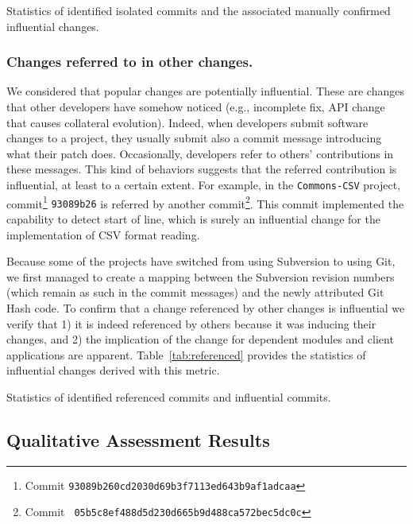 \begin{table}[t]
\centering
\caption{Statistics of identified isolated commits and the associated manually confirmed influential changes.}

\label{tab:isolated}
\end{table}


\subsubsection{Changes referred to in other changes.}
We considered that popular changes are potentially influential.
These are changes that other developers have somehow noticed (e.g., incomplete fix,
API change that causes collateral evolution). Indeed,
when developers submit software changes to a project, they usually submit
also a commit message introducing what their patch does. Occasionally,
developers refer to others' contributions in these messages. This kind of
behaviors suggests that the referred contribution is influential, at
least to a certain extent. For example, in the {\tt Commons-CSV} project, 
commit\footnote{Commit \tt\small 93089b260cd2030d69b3f7113ed643b9af1adcaa} 
{\tt 93089b26} is referred by another commit\footnote{Commit \tt\small
05b5c8ef488d5d230d665b9d488ca572bec5dc0c}.
This commit implemented the capability to detect start of line, 
which is surely an influential change for the implementation of CSV format reading.

Because some of the projects have switched from
using Subversion to using Git, we first managed to create a mapping between
the Subversion revision numbers (which remain as such in the commit messages) and
the newly attributed Git Hash code. 
To confirm that a change referenced by other changes is influential we verify that 1) it is indeed referenced by 
others because it was inducing their changes, and 2) the implication of the change for dependent modules and client applications
are apparent. Table~\ref{tab:referenced} provides the
statistics of influential changes derived with this metric.


\begin{table}[t!]
\centering
\caption{Statistics of identified referenced commits and influential commits.}

\label{tab:referenced}
\end{table}


\subsection{Qualitative Assessment Results}

